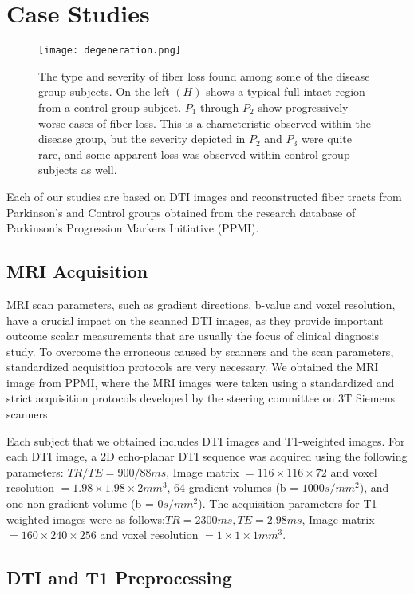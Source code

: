 \section{Case Studies}

\begin{figure*}[!ht]
\centering
\texttt{[image: degeneration.png]}
\caption{The type and severity of fiber loss found among some of the disease group subjects. On the left $(H)$ shows a typical full intact region from a control group subject. $P_1$ through $P_2$ show progressively worse cases of fiber loss. This is a characteristic observed within the disease group, but the severity depicted in $P_2$ and $P_3$ were quite rare, and some apparent loss was observed within control group subjects as well.}
\label{fig:loss}
\end{figure*}

Each of our studies are based on DTI images and reconstructed fiber tracts from Parkinson's and Control groups obtained from the research database of Parkinson's Progression Markers Initiative (PPMI).  

\subsection{MRI Acquisition}

MRI scan parameters, such as gradient directions, b-value and voxel resolution, have a crucial impact on the scanned DTI images, as they provide important outcome scalar measurements that are usually the focus of clinical diagnosis study. To overcome the erroneous caused by scanners and the scan parameters, standardized acquisition protocols are very necessary. We obtained the MRI image from PPMI, where the MRI images were taken using a standardized and strict acquisition protocols developed by the steering committee on 3T Siemens scanners.

Each subject that we obtained includes DTI images and T1-weighted images. For each DTI image, a 2D echo-planar DTI sequence was acquired using the following parameters: $ TR/TE = 900/88ms$, Image matrix $= 116\times116\times72$ and voxel resolution $ = 1.98\times1.98\times2mm^3$, 64 gradient volumes (b = $1000s/mm^2$), and one non-gradient volume (b = $0s/mm^2$).  The acquisition parameters for T1-weighted images were as follows:$ TR = 2300ms, TE = 2.98ms$, Image matrix $= 160\times240\times256$ and voxel resolution $ = 1\times1\times1mm^3$. 


\subsection{DTI and T1 Preprocessing}


